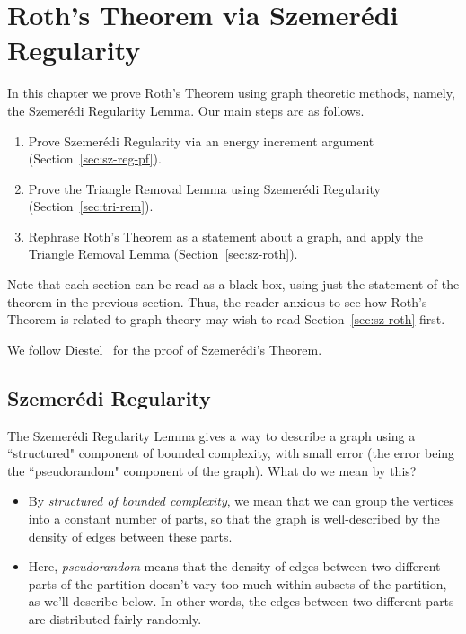 \chapter{Roth's Theorem via Szemer\'edi Regularity}

In this chapter we prove Roth's Theorem using graph theoretic methods, namely, the Szemer\'edi Regularity Lemma. Our main steps are as follows.
\begin{enumerate}
\item
Prove Szemer\'edi Regularity via an energy increment argument (Section~\ref{sec:sz-reg-pf}).
\item
Prove the Triangle Removal Lemma using Szemer\'edi Regularity (Section~\ref{sec:tri-rem}).
\item
Rephrase Roth's Theorem as a statement about a graph, and apply the Triangle Removal Lemma (Section~\ref{sec:sz-roth}).
\end{enumerate}

Note that each section can be read as a black box, using just the statement of the theorem in the previous section. Thus, the reader anxious to see how Roth's Theorem is related to graph theory may wish to read Section~\ref{sec:sz-roth} first.

We follow Diestel~\cite[\S7.4]{Di05} for the proof of Szemer\'edi's Theorem.

\section{Szemer\'edi Regularity}
The Szemer\'edi Regularity Lemma gives a way to describe a graph using a ``structured" component of bounded complexity, with small error (the error being the ``pseudorandom" component of the graph). What do we mean by this?
\begin{itemize}
\item
By {\it structured of bounded complexity}, we mean that we can group the vertices into a constant number of parts, so that the graph is well-described by the density of edges between these parts.
\item
Here, {\it pseudorandom} means that the density of edges between two different parts of the partition doesn't vary too much within subsets of the partition, as we'll describe below.
In other words, the edges between two different parts are distributed fairly randomly. 
\end{itemize}

